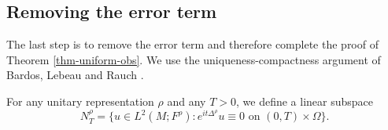 \documentclass[11pt,oneside,reqno]{amsart}
\newtheorem{proposition}[theorem]{Proposition}
\theoremstyle{definition}
\numberwithin{equation}{section}
\theoremstyle{plain}
\begin{document}
\subsection{Removing the error term}
The last step is to remove the error term and therefore complete the proof of Theorem \ref{thm-uniform-obs}. We use the  uniqueness-compactness argument of Bardos, Lebeau and Rauch \cite{bardo1992}. 


For any unitary representation $\rho$ and any $T>0$, we define a linear subspace
 \begin{equation*}
     N_T^\rho=\lbrace u\in L^2(M;F^\rho):e^{it\Delta^\rho}u\equiv 0 \text{ on } (0,T)\times \Omega\rbrace.
 \end{equation*}
\end{document}

